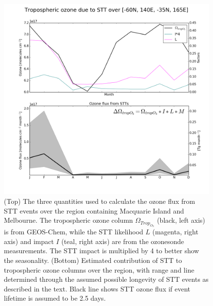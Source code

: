 \documentclass[acp, manuscript]{copernicus} %
\begin{document}
    \begin{figure}
      \includegraphics[width=12.0cm]{figures/STT_extrapolation_MelbMac_B.png}
      \caption{%
	(Top) The three quantities used to calculate the ozone flux from STT events over the region containing Macquarie Island and Melbourne.
	The tropospheric ozone column $\Omega_{Trop_{O_3}}$ (black, left axis) is from GEOS-Chem, while the STT likelihood $L$ (magenta, right axis) and impact $I$ (teal, right axis) are from the ozonesonde measurements.
	The STT impact is multiplied by 4 to better show the seasonality.
	(Bottom) Estimated contribution of STT to tropospheric ozone columns over the region, with range and line determined through the assumed possible longevity of STT events as described in the text.
	Black line shows STT ozone flux if event lifetime is assumed to be 2.5 days.}
      \label{fig:MExtrapolation}
    \end{figure}
\end{document}

